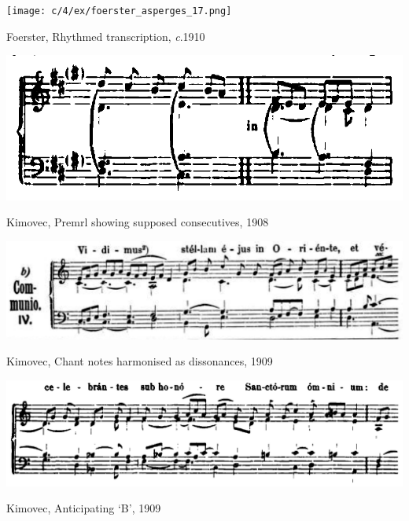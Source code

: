 \vspace*{\fill}

\begin{example}
  \centering
  \texttt{[image: c/4/ex/foerster\_asperges\_17.png]}
  \caption{Foerster, Rhythmed transcription, \emph{c}.1910}
  \label{mus:foerster_asperges_17}
\end{example}

\vspace*{\fill}

\begin{example}
  \centering
  \includegraphics[width=\linewidth]{c/4/ex/kimovec_angelis.png}
  \caption{Kimovec, Premrl showing supposed consecutives, 1908}
  \label{mus:kimovec_angelis}
\end{example}

\vspace*{\fill}

\newpage

\vspace*{\fill}

\begin{example}
  \centering
  \includegraphics[width=\linewidth]{c/4/ex/kimovec_communio_7.png}
  \caption{Kimovec, Chant notes harmonised as dissonances, 1909}
  \label{mus:kimovec_communio_7}
\end{example}

\vspace*{\fill}

\begin{example}
  \centering
  \includegraphics[width=\linewidth]{c/4/ex/kimovec_sharp_34.png}
  \caption{Kimovec, Anticipating `B'\kern 1pt\natural{}, 1909}
  \label{mus:kimovec_sharp_34}
\end{example}

